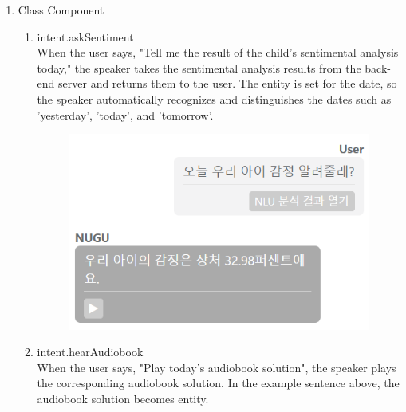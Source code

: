 \documentclass[conference]{IEEEtran}
\begin{document}
\begin{enumerate}
\begin{enumerate}
            \item Class Component
            \begin{enumerate}
                \item intent.askSentiment
                \\When the user says, "Tell me the result of the child's sentimental analysis today," the speaker takes the sentimental analysis results from the back-end server and returns them to the user. The entity is set for the date, so the speaker automatically recognizes and distinguishes the dates such as 'yesterday', 'today', and 'tomorrow'.
                \begin{figure}[H]
            \centering
            \includegraphics[scale=0.5]{new_assets/nugu-play-sentiment.png}
            \end{figure}
                
                \item intent.hearAudiobook
                \\When the user says, "Play today's audiobook solution", the speaker plays the corresponding audiobook solution. In the example sentence above, the audiobook solution becomes entity.
                

\end{enumerate}
\end{enumerate}
\end{enumerate}
\end{document}
